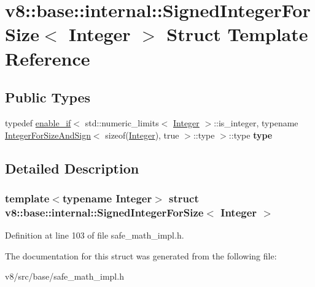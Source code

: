 \hypertarget{structv8_1_1base_1_1internal_1_1SignedIntegerForSize}{}\section{v8\+:\+:base\+:\+:internal\+:\+:Signed\+Integer\+For\+Size$<$ Integer $>$ Struct Template Reference}
\label{structv8_1_1base_1_1internal_1_1SignedIntegerForSize}
\subsection*{Public Types}
\begin{DoxyCompactItemize}
\item 
\mbox{\label{structv8_1_1base_1_1internal_1_1SignedIntegerForSize_af8a9ac8802ec99183ef49ecfb496eefa}} 
typedef \mbox{\hyperlink{structv8_1_1base_1_1internal_1_1enable__if}{enable\+\_\+if}}$<$ std\+::numeric\+\_\+limits$<$ \mbox{\hyperlink{classv8_1_1Integer}{Integer}} $>$\+::is\+\_\+integer, typename \mbox{\hyperlink{structv8_1_1base_1_1internal_1_1IntegerForSizeAndSign}{Integer\+For\+Size\+And\+Sign}}$<$ sizeof(\mbox{\hyperlink{classv8_1_1Integer}{Integer}}), true $>$\+::type $>$\+::type {\bfseries type}
\end{DoxyCompactItemize}


\subsection{Detailed Description}
\subsubsection*{template$<$typename Integer$>$\newline
struct v8\+::base\+::internal\+::\+Signed\+Integer\+For\+Size$<$ Integer $>$}



Definition at line 103 of file safe\+\_\+math\+\_\+impl.\+h.



The documentation for this struct was generated from the following file\+:\begin{DoxyCompactItemize}
\item 
v8/src/base/safe\+\_\+math\+\_\+impl.\+h\end{DoxyCompactItemize}
